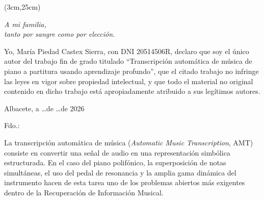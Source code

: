 \begin{textblock*}{\linewidth}(3cm,25cm) 
\begin{flushright}
{\fontsize{14pt}{4pt}\selectfont \fecha}
\end{flushright}
\end{textblock*}


\cleardoublepage
\thispagestyle{empty}

\vspace*{9cm}  
\begin{flushright} \em 
A mi familia, \\
tanto por sangre como por elección.
\end{flushright}


\cleardoublepage
\thispagestyle{plain}
\begin{center}
\Large{}
\end{center}
\vskip1cm

Yo, María Piedad Castex Sierra, con DNI 20514506R, declaro que soy el único autor del trabajo fin de grado titulado ``Transcripción automática de música de piano a
partitura usando aprendizaje profundo'', que el citado trabajo no infringe las leyes en vigor sobre propiedad intelectual, y que todo el material no original contenido en dicho trabajo está apropiadamente atribuido a sus legítimos autores.

\vspace*{2cm}
\begin{center}
Albacete, a \quad \ldots \quad de \quad \ldots \quad de 2026

\vskip3cm

Fdo.: \autor
\end{center}


\cleardoublepage
\thispagestyle{plain}
\begin{center}
\Large{}
\end{center}
\vskip1cm

La transcripción automática de música (\textit{Automatic Music
Transcription}, AMT) consiste en convertir una señal de audio en una
representación simbólica estructurada. En el caso del piano
polifónico, la superposición de notas simultáneas, el uso del pedal
de resonancia y la amplia gama dinámica del instrumento hacen de esta
tarea uno de los problemas abiertos más exigentes dentro de la
Recuperación de Información Musical.

